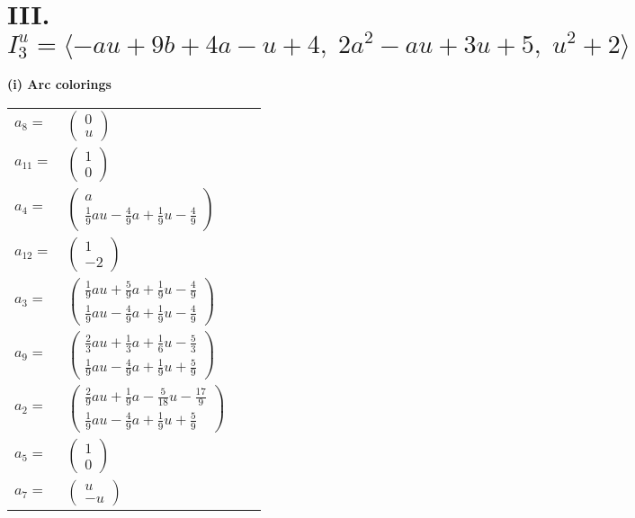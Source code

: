 \documentclass[1p]{elsarticle_modified}
\theoremstyle{definition}
\begin{document}
\centering \section*{III. $I^u_{3}= \langle - a u+9 b+4 a- u+4,\;2 a^2- a u+3 u+5,\;u^2+2 \rangle$}
\flushleft \textbf{(i) Arc colorings}\\
\begin{tabular}{m{7pt} m{180pt} m{7pt} m{180pt} }
\flushright $a_{8}=$&$\begin{pmatrix}0\\u\end{pmatrix}$ \\
\flushright $a_{11}=$&$\begin{pmatrix}1\\0\end{pmatrix}$ \\
\flushright $a_{4}=$&$\begin{pmatrix}a\\\frac{1}{9} a u-\frac{4}{9} a+\frac{1}{9} u-\frac{4}{9}\end{pmatrix}$ \\
\flushright $a_{12}=$&$\begin{pmatrix}1\\-2\end{pmatrix}$ \\
\flushright $a_{3}=$&$\begin{pmatrix}\frac{1}{9} a u+\frac{5}{9} a+\frac{1}{9} u-\frac{4}{9}\\\frac{1}{9} a u-\frac{4}{9} a+\frac{1}{9} u-\frac{4}{9}\end{pmatrix}$ \\
\flushright $a_{9}=$&$\begin{pmatrix}\frac{2}{3} a u+\frac{1}{3} a+\frac{1}{6} u-\frac{5}{3}\\\frac{1}{9} a u-\frac{4}{9} a+\frac{1}{9} u+\frac{5}{9}\end{pmatrix}$ \\
\flushright $a_{2}=$&$\begin{pmatrix}\frac{2}{9} a u+\frac{1}{9} a-\frac{5}{18} u-\frac{17}{9}\\\frac{1}{9} a u-\frac{4}{9} a+\frac{1}{9} u+\frac{5}{9}\end{pmatrix}$ \\
\flushright $a_{5}=$&$\begin{pmatrix}1\\0\end{pmatrix}$ \\
\flushright $a_{7}=$&$\begin{pmatrix}u\\- u\end{pmatrix}$ \\

\end{tabular}
\end{document}
